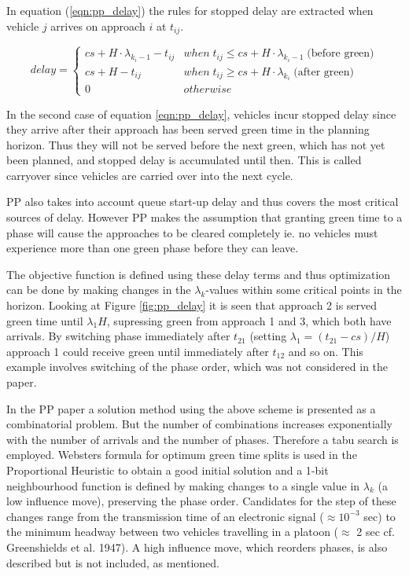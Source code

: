 In equation (\ref{eqn:pp_delay}) the rules for stopped delay are
extracted when vehicle $j$ arrives on approach $i$ at $t_{ij}$.

\begin{equation}
delay = 
\begin{cases}
cs + H \cdot \lambda_{k_i-1} - t_{ij} & when \; t_{ij} \leq cs + H \cdot \lambda_{k_i-1} \; \mbox{(before green)}  \\
cs + H - t_{ij} & when \; t_{ij} \geq cs + H \cdot \lambda_{k_i} \; \mbox{(after green)}  \\
0 & otherwise
\end{cases}
\label{eqn:pp_delay}
\end{equation}

In the second case of equation \ref{eqn:pp_delay}, vehicles incur
stopped delay since they arrive after their approach has been served
green time in the planning horizon. Thus they will not be served
before the next green, which has not yet been planned, and stopped
delay is accumulated until then. This is called carryover since
vehicles are carried over into the next cycle.

PP also takes into account queue start-up delay and thus covers the
most critical sources of delay. However PP makes the assumption that
granting green time to a phase will cause the approaches to be
cleared completely ie. no vehicles must experience more than one green
phase before they can leave.

The objective function is defined using these delay terms and thus
optimization can be done by making changes in the $\lambda_k$-values
within some critical points in the horizon. Looking at Figure
\ref{fig:pp_delay} it is seen that approach 2 is served green time
until $\lambda_1 H$, supressing green from approach 1 and 3, which
both have arrivals. By switching phase immediately after $t_{21}$
(setting $\lambda_1 = (t_{21} - cs)/H$) approach 1 could receive green
until immediately after $t_{12}$ and so on. This example involves
switching of the phase order, which was not considered in the paper.

In the PP paper \cite{1} a solution method using the above scheme is
presented as a combinatorial problem. But the number of combinations
increases exponentially with the number of arrivals and the number of
phases. Therefore a tabu search is employed. Websters formula for
optimum green time splits is used in the Proportional Heuristic to
obtain a good initial solution and a 1-bit neighbourhood function is
defined by making changes to a single value in $\lambda_k$ (a low
influence move), preserving the phase order. Candidates for the step
of these changes range from the transmission time of an electronic
signal ($\approx 10^{-3}$ sec) to the minimum headway between two
vehicles travelling in a platoon ($\approx$ 2 sec cf. Greenshields et
al. 1947).  A high influence move, which reorders phases, is also
described but is not included, as mentioned.


